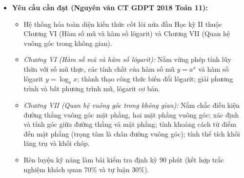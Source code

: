 \documentclass[12pt, a4paper]{article}
\begin{document}
\begin{itemize}[leftmargin=1.2cm]
    \item \textbf{Yêu cầu cần đạt (Nguyên văn CT GDPT 2018 Toán 11):}
    \begin{itemize}[leftmargin=0.6cm]
        \item Hệ thống hóa toàn diện kiến thức cốt lõi nửa đầu Học kỳ II thuộc Chương VI (Hàm số mũ và hàm số lôgarit) và Chương VII (Quan hệ vuông góc trong không gian).
        \item \textit{Chương VI (Hàm số mũ và hàm số lôgarit):} Nắm vững phép tính lũy thừa với số mũ thực, các tính chất của hàm số mũ $y = a^x$ và hàm số lôgarit $y = \log_a x$; thành thạo công thức biến đổi lôgarit; giải phương trình và bất phương trình mũ, lôgarit cơ bản.
        \item \textit{Chương VII (Quan hệ vuông góc trong không gian):} Nắm chắc điều kiện đường thẳng vuông góc mặt phẳng, hai mặt phẳng vuông góc; xác định và tính góc giữa đường thẳng và mặt phẳng; tính khoảng cách từ điểm đến mặt phẳng (trọng tâm là chân đường vuông góc); tính thể tích khối lăng trụ và khối chóp.
        \item Rèn luyện kỹ năng làm bài kiểm tra định kỳ 90 phút (kết hợp trắc nghiệm khách quan 70\% và tự luận 30\%).
    \end{itemize}


\end{itemize}
\end{document}
